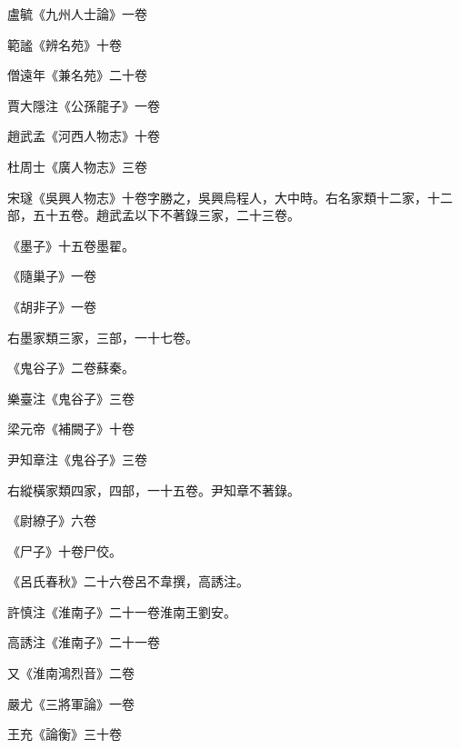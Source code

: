 \begin{pinyinscope}
 盧毓《九州人士論》一卷



 範謐《辨名苑》十卷



 僧遠年《兼名苑》二十卷



 賈大隱注《公孫龍子》一卷



 趙武孟《河西人物志》十卷



 杜周士《廣人物志》三卷



 宋璲《吳興人物志》十卷字勝之，吳興烏程人，大中時。右名家類十二家，十二部，五十五卷。趙武孟以下不著錄三家，二十三卷。



 《墨子》十五卷墨翟。



 《隨巢子》一卷



 《胡非子》一卷



 右墨家類三家，三部，一十七卷。



 《鬼谷子》二卷蘇秦。



 樂臺注《鬼谷子》三卷



 梁元帝《補闕子》十卷



 尹知章注《鬼谷子》三卷



 右縱橫家類四家，四部，一十五卷。尹知章不著錄。



 《尉繚子》六卷



 《尸子》十卷尸佼。



 《呂氏春秋》二十六卷呂不韋撰，高誘注。



 許慎注《淮南子》二十一卷淮南王劉安。



 高誘注《淮南子》二十一卷



 又《淮南鴻烈音》二卷



 嚴尤《三將軍論》一卷



 王充《論衡》三十卷




\end{pinyinscope}
